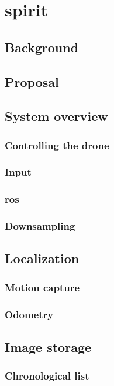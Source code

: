 \chapter{\acrlong{spirit}}
\label{ch:spirit}
\section{Background}
\section{Proposal}
\section{System overview}
  \subsection{Controlling the drone}
  \subsection{Input}
  \subsection{\acrlong{ros}}
  \subsection{Downsampling}
\section{Localization}
  \subsection{Motion capture}
  \subsection{Odometry}
\section{Image storage}
  \subsection{Chronological list}
